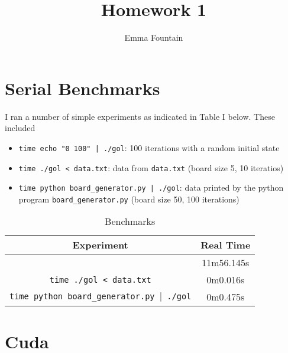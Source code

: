 \documentclass[9pt,technote]{IEEEtran}
\begin{document}
\title{Homework 1}
\author{Emma Fountain}

\maketitle

\section{Serial Benchmarks}

I ran a number of simple experiments as indicated in Table I below. These included

\begin{itemize}
    \item \texttt{time echo "0 100" | ./gol}: 100 iterations with a random initial state
    \item \texttt{time ./gol < data.txt}: data from \texttt{data.txt} (board size 5, 10 iteratios)
    \item \texttt{time python board\_generator.py | ./gol}: data printed by the python program \texttt{board\_generator.py} (board size 50, 100 iterations)
\end{itemize}

\begin{table}

    \renewcommand{\arraystretch}{1.3}
    \caption{Benchmarks}
    \centering

    \begin{tabular}{|c||c|}
	\hline
	\textbf{Experiment} & Real Time \\ \hline\hline
	\textt{time echo "0 100" $|$ ./gol} & 11m56.145s \\ \hline
	\texttt{time ./gol < data.txt} & 0m0.016s \\ \hline
	\texttt{time python board\_generator.py $|$ ./gol} & 0m0.475s \\ \hline
    \end{tabular}

\end{table}

\section{Cuda}
\end{document}
